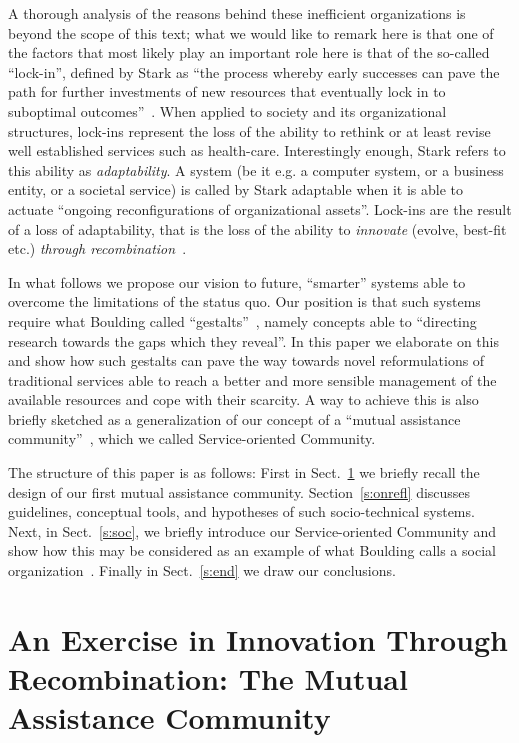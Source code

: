 \documentclass{llncs}
\begin{document}
A thorough analysis of the reasons behind these inefficient organizations
is beyond the scope of this text; what we would like to remark here is that
one of the factors that most likely play an important role here is that of the so-called
``lock-in'', defined by Stark as ``the process whereby early successes
can pave the path for further investments of new resources that eventually
lock in to suboptimal outcomes''~\cite{Stark}. 
When applied to society and
its organizational structures, lock-ins represent the loss of the ability
to rethink or at least revise well established services such as health-care.
Interestingly enough, Stark refers to this ability as \emph{adaptability}. A system
(be it e.g. a computer system, or a business entity, or a societal service)
is called by Stark adaptable when it is able to actuate ``ongoing reconfigurations of organizational
assets''. Lock-ins are the result of a loss of adaptability,
that is the loss of the ability to 
\emph{innovate\/} (evolve, best-fit etc.) \emph{through recombination\/}~\cite{Hol95}.

In what follows we propose our vision to future, ``smarter''
systems able to overcome the limitations of the status quo. Our position is that
such systems require what Boulding called
``gestalts''~\cite{Bou56}, namely concepts able to ``directing research towards the gaps 
which they reveal''. In this
paper we elaborate on this and show how such gestalts can pave the way towards novel reformulations of
traditional services able to reach a better and more sensible management of the available resources and
cope with their scarcity. A way to achieve this is also briefly sketched 
as a generalization of our concept of a ``mutual assistance community''~\cite{SDGB10b}, which we
called Service-oriented Community.

The structure of this paper is as follows: First in Sect.~\ref{s:mac}
we briefly recall the design of our first mutual assistance community. Section~\ref{s:onrefl}
discusses guidelines, conceptual tools, and hypotheses of such socio-technical systems.
Next, in Sect.~\ref{s:soc}, we briefly introduce our Service-oriented Community and
show how this may be considered as an example of what Boulding calls 
a social organization~\cite{Bou56}.
Finally in Sect.~\ref{s:end} we draw our conclusions.




\section{An Exercise in Innovation Through Recombination: The Mutual Assistance Community}\label{s:mac}
\end{document}
